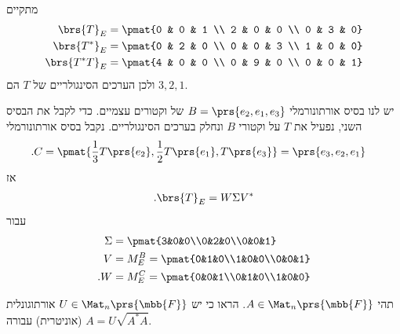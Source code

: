 \documentclass[a4paper,10pt,twoside,openany]{book}
\begin{document}
\begin{solution}
מתקיים
\begin{align*}
\brs{T}_E &= \pmat{0 & 0 & 1 \\ 2 & 0 & 0 \\ 0 & 3 & 0} \\
\brs{T^*}_E &= \pmat{0 & 2 & 0 \\ 0 & 0 & 3 \\ 1 & 0 & 0} \\
\brs{T^* T}_E &= \pmat{4 & 0 & 0 \\ 0 & 9 & 0 \\ 0 & 0 & 1}
\end{align*}
ולכן הערכים הסינגולריים של
$T$
הם
$3,2,1$.

יש לנו בסיס אורתונורמלי
$B = \prs{e_2, e_1, e_3}$
של וקטורים עצמיים.
כדי לקבל את הבסיס השני, נפעיל את
$T$
על וקטורי
$B$
ונחלק בערכים הסינגולריים.
נקבל בסיס אורתונורמלי
\begin{align*}
\text{.} C &= \pmat{\frac{1}{3} T\prs{e_2}, \frac{1}{2} T\prs{e_1}, T\prs{e_3}}
= \prs{e_3, e_2, e_1}
\end{align*}
אז
\begin{align*}
\text{.} \brs{T}_E = W \Sigma V^*
\end{align*}
עבור
\begin{align*}
\Sigma &= \pmat{3&0&0\\0&2&0\\0&0&1} \\
V &= M^B_E = \pmat{0&1&0\\1&0&0\\0&0&1}\\
\text{.} W &= M^C_E = \pmat{0&0&1\\0&1&0\\1&0&0}
\end{align*}
\end{solution}

\begin{exercisechap}
תהי
$A \in \Mat_n\prs{\mbb{F}}$.
הראו כי יש
$U \in \Mat_n\prs{\mbb{F}}$
אורתוגונלית (אוניטרית) עבורה
$A = U \sqrt{A^* A}$.
\end{exercisechap}
\end{document}

